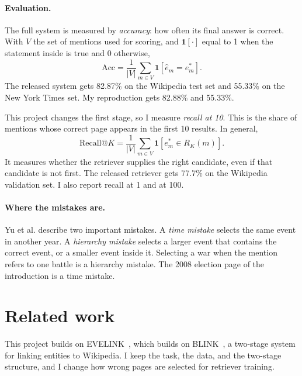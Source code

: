 \documentclass[11pt]{article}
\theoremstyle{definition}
\newcommand{\citeauthor}[1]{Yu et al.}
\begin{document}
\paragraph{Evaluation.} The full system is measured by \emph{accuracy}: how often its final answer is correct. With $V$ the set of mentions used for scoring, and $\mathbf{1}[\cdot]$ equal to 1 when the statement inside is true and 0 otherwise,
\begin{equation}
  \mathrm{Acc} = \frac{1}{|V|}\sum_{m \in V} \mathbf{1}\!\left[\hat{e}_m = e^{*}_m\right].
  \label{eq:acc}
\end{equation}
The released system gets 82.87\% on the Wikipedia test set and 55.33\% on the New York Times set. My reproduction gets 82.88\% and 55.33\%.

This project changes the first stage, so I measure \emph{recall at 10}. This is the share of mentions whose correct page appears in the first 10 results. In general,
\begin{equation}
  \mathrm{Recall@}K = \frac{1}{|V|}\sum_{m \in V} \mathbf{1}\!\left[e^{*}_m \in R_K(m)\right].
  \label{eq:recall}
\end{equation}
It measures whether the retriever supplies the right candidate, even if that candidate is not first. The released retriever gets 77.7\% on the Wikipedia validation set. I also report recall at 1 and at 100.

\paragraph{Where the mistakes are.} \citeauthor{yu2023event} describe two important mistakes. A \emph{time mistake} selects the same event in another year. A \emph{hierarchy mistake} selects a larger event that contains the correct event, or a smaller event inside it. Selecting a war when the mention refers to one battle is a hierarchy mistake. The 2008 election page of the introduction is a time mistake.

\section{Related work}

This project builds on EVELINK~\cite{yu2023event}, which builds on BLINK~\cite{wu2020blink}, a two-stage system for linking entities to Wikipedia. I keep the task, the data, and the two-stage structure, and I change how wrong pages are selected for retriever training.
\end{document}
